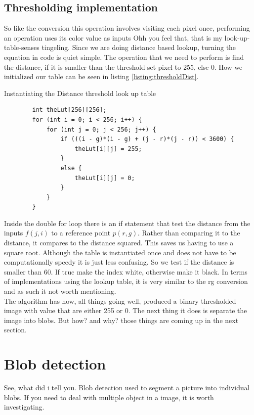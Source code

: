\subsection{Thresholding implementation}
So like the conversion this operation involves  visiting each pixel once, performing an operation uses its color value as inputs Ohh you feel that, that is my look-up-table-senses tingeling.  Since we are doing distance based lookup, turning the equation in code is quiet simple. The operation that we need to perform is find the distance, if it is smaller than the threshold  set pixel to 255, else 0. How we initialized our table can be seen in listing \ref{listing:thresholdDist}.
\begin{listing}[H]
	\caption{Instantiating the Distance threshold look up table}
	\label{listing:thresholdDist}
	\begin{verbatim}
		int theLut[256][256];
		for (int i = 0; i < 256; i++) {
			for (int j = 0; j < 256; j++) {
				if (((i - g)*(i - g) + (j - r)*(j - r)) < 3600) {
					theLut[i][j] = 255;
				}
				else {
					theLut[i][j] = 0;
				}
			}
		}
	\end{verbatim}
\end{listing}
Inside the double for loop there is an if statement that test the distance from the inputs $f(j,i)$ to a reference point $p(r,g)$. Rather than comparing it to the distance, it compares to the distance squared. This saves us having to use a square root. Although the table is instantiated once and does not have to be computationally speedy it is just less confusing. So we test if the distance is smaller than 60. If true make the index white, otherwise make it black. 
In terms of implementations using the lookup table, it is very similar to the rg conversion and as such it not worth mentioning.\\
The algorithm has now, all things going well, produced a binary thresholded image with value that are either 255 or 0. The next thing it does is separate the image into blobs. But how? and why? those things are coming up in the next section. 
\section{Blob detection}
See, what did i tell you. Blob detection used to segment a picture into individual blobs. If you need to deal with multiple object in a image, it is worth investigating. 
